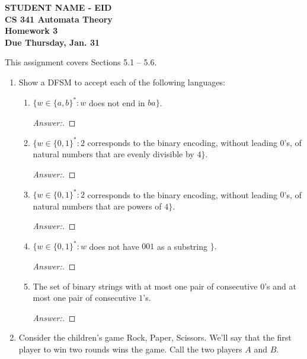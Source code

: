 \documentclass[10pt]{article}
\begin{document}
\begin{flushleft}
\textbf{STUDENT NAME - EID \\
CS 341 Automata Theory \\
Homework 3 \\
Due Thursday, Jan. 31}
\end{flushleft}
This assignment covers Sections 5.1 -- 5.6. \\

\begin{enumerate}
\addtocounter{enumi}{1}

\item
Show a DFSM to accept each of the following languages:
\begin{enumerate}

\addtocounter{enumii}{1}
\item
$\{w \in \{a, b\}^* : w$ does not end in $ba\}$.
\begin{proof}[Answer:]
\end{proof}


\item
$\{w \in \{0, 1\}^* : 2$ corresponds to the binary encoding, without leading $0$'s, of natural numbers that are evenly divisible by $4\}$.
\begin{proof}[Answer:]
\end{proof}

\item
$\{w \in \{0, 1\}^* : 2$ corresponds to the binary encoding, without leading $0$'s, of natural numbers that are powers of $4\}$.
\begin{proof}[Answer:]
\end{proof}

\addtocounter{enumii}{2}
\item
$\{w \in \{0, 1\}^* : w$ does not have $001$ as a substring $\}.$
\begin{proof}[Answer:]
\end{proof}

\addtocounter{enumii}{4}
\item
The set of binary strings with at most one pair of consecutive $0$'s and at most one pair of consecutive $1$'s.
\begin{proof}[Answer:]
\end{proof}
\end{enumerate}


\item
Consider the children's game Rock, Paper, Scissors.  We'll say that the first player to win two rounds wins the game.  Call the two players $A$ and $B$.
\begin{enumerate}


\end{enumerate}
\end{enumerate}
\end{document}
